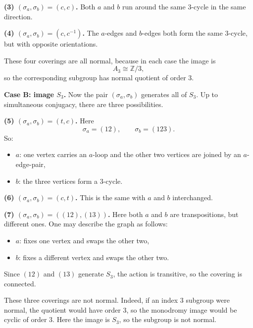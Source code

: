 \documentclass[12pt,a4paper]{article}
\theoremstyle{notespace}
\begin{document}
\medskip

\textbf{(3) \((\sigma_a,\sigma_b)=(c,c)\).}
Both \(a\) and \(b\) run around the same \(3\)-cycle in the same direction.

\medskip

\textbf{(4) \((\sigma_a,\sigma_b)=(c,c^{-1})\).}
The \(a\)-edges and \(b\)-edges both form the same \(3\)-cycle, but with opposite orientations.

\medskip

These four coverings are all normal, because in each case the image is
\[
A_3\cong \mathbb Z/3,
\]
so the corresponding subgroup has normal quotient of order \(3\).

\medskip

\textbf{Case B: image \(S_3\).}
Now the pair \((\sigma_a,\sigma_b)\) generates all of \(S_3\). Up to simultaneous conjugacy, there are three possibilities.

\medskip

\textbf{(5) \((\sigma_a,\sigma_b)=(t,c)\).}
Here
\[
\sigma_a=(12),\qquad \sigma_b=(123).
\]
So:
\begin{itemize}
	\item \(a\): one vertex carries an \(a\)-loop and the other two vertices are joined by an \(a\)-edge-pair,
	\item \(b\): the three vertices form a \(3\)-cycle.
\end{itemize}

\medskip

\textbf{(6) \((\sigma_a,\sigma_b)=(c,t)\).}
This is the same with \(a\) and \(b\) interchanged.

\medskip

\textbf{(7) \((\sigma_a,\sigma_b)=((12),(13))\).}
Here both \(a\) and \(b\) are transpositions, but different ones. One may describe the graph as follows:
\begin{itemize}
	\item \(a\): fixes one vertex and swaps the other two,
	\item \(b\): fixes a different vertex and swaps the other two.
\end{itemize}
Since \((12)\) and \((13)\) generate \(S_3\), the action is transitive, so the covering is connected.

\medskip

These three coverings are not normal. Indeed, if an index \(3\) subgroup were normal, the quotient would have order \(3\), so the monodromy image would be cyclic of order \(3\). Here the image is \(S_3\), so the subgroup is not normal.
\end{document}
